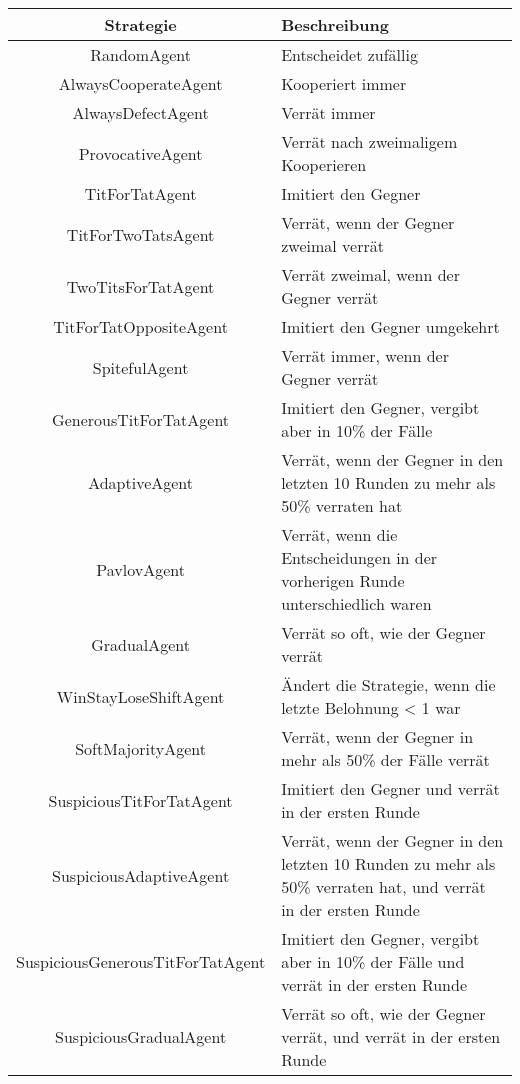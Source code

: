 \begin{longtable}{|c|m{7cm}|}
    \hline
    \textbf{Strategie} & \textbf{Beschreibung} \\
    \hline
    RandomAgent & Entscheidet zufällig \\
    \hline
    AlwaysCooperateAgent & Kooperiert immer \\
    \hline
    AlwaysDefectAgent & Verrät immer \\
    \hline
    ProvocativeAgent & Verrät nach zweimaligem Kooperieren \\
    \hline
    TitForTatAgent & Imitiert den Gegner \\
    \hline
    TitForTwoTatsAgent & Verrät, wenn der Gegner zweimal verrät \\
    \hline
    TwoTitsForTatAgent & Verrät zweimal, wenn der Gegner verrät \\
    \hline
    TitForTatOppositeAgent & Imitiert den Gegner umgekehrt \\
    \hline
    SpitefulAgent & Verrät immer, wenn der Gegner verrät \\
    \hline
    GenerousTitForTatAgent & Imitiert den Gegner, vergibt aber in 10\% der Fälle \\
    \hline
    AdaptiveAgent & Verrät, wenn der Gegner in den letzten 10 Runden zu mehr als 50\% verraten hat \\
    \hline
    PavlovAgent & Verrät, wenn die Entscheidungen in der vorherigen Runde unterschiedlich waren \\
    \hline
    GradualAgent & Verrät so oft, wie der Gegner verrät \\
    \hline
    WinStayLoseShiftAgent & Ändert die Strategie, wenn die letzte Belohnung < 1 war \\
    \hline
    SoftMajorityAgent & Verrät, wenn der Gegner in mehr als 50\% der Fälle verrät \\
    \hline
    SuspiciousTitForTatAgent & Imitiert den Gegner und verrät in der ersten Runde \\
    \hline
    SuspiciousAdaptiveAgent & Verrät, wenn der Gegner in den letzten 10 Runden zu mehr als 50\% verraten hat, und verrät in der ersten Runde \\
    \hline
    SuspiciousGenerousTitForTatAgent & Imitiert den Gegner, vergibt aber in 10\% der Fälle und verrät in der ersten Runde \\
    \hline
    SuspiciousGradualAgent & Verrät so oft, wie der Gegner verrät, und verrät in der ersten Runde \\

\end{longtable}

